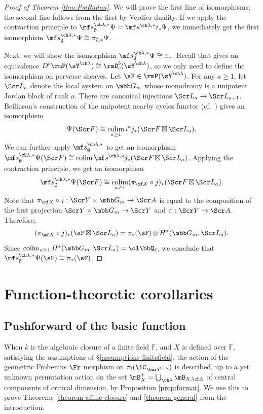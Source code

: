 \documentclass[final]{amsart}
\theoremstyle{remark}
\theoremstyle{definition}
\DeclareMathOperator*{\ot}{\otimes}
\DeclareMathOperator*{\bt}{\boxtimes}
\DeclareMathOperator*{\colim}{colim}
\numberwithin{equation}{section}
\begin{document}
\begin{proof}[Proof of Theorem \ref{thm:PsiRadon}]
We will prove the first line of isomorphisms; the second line follows from the first 
by Verdier duality. 
If we apply the contraction principle to 
$\mf s^{\ch\lambda,*}_\emptyset\Psi
= \mf s^{\ch\lambda,*} i_* \Psi$, 
we immediately get the first isomorphism 
$\mf s^{\ch\lambda,*}_\emptyset \Psi \cong \pi_{\emptyset,*}\Psi$. 


Next, we will show the isomorphism $\mf s^{\ch\lambda,*}_\emptyset \Psi \cong \pi_*$. 
Recall that \cite{Beilinson2} gives an equivalence 
$D^b \rmP(\sY^{\ch\lambda}) \cong \rmD^b_c(\sY^{\ch\lambda})$, 
so we only need to define the isomorphism on perverse sheaves. 
Let $\sF \in \rmP(\sY^{\ch\lambda})$. 
For any $a \ge 1$, let $\Scr L_a$ denote the local system on $\mbb G_m$
whose monodromy is a unipotent Jordan block of rank $a$. There are canonical
injections $\Scr L_a \to \Scr L_{a+1}$.
Beilinson's construction of the unipotent nearby cycles functor 
(cf.~\cite[2.3]{Beilinson}) gives an isomorphism 
\[ \Psi(\Scr F) \cong \colim_{a\ge 1} i^*j_*(\Scr F \bt \Scr L_a). \]
We can further apply $\mf s^{\ch\lambda,*}_\emptyset$ to get
an isomorphism $\mf s^{\ch\lambda,*}_\emptyset \Psi(\Scr F) \cong \colim \mf s^{\ch\lambda,*} j_*(\Scr F \bt \Scr L_a)$.
Applying the contraction principle, we get an isomorphism 
\[ \mf s^{\ch\lambda,*}_\emptyset \Psi(\Scr F) \cong \colim_{a\ge 1}
(\pi_{\mf X} \circ j)_*(\Scr F \bt \Scr L_a). \]
Note that $\pi_{\mf X}\circ j : \Scr Y \times \mbb G_m \to \Scr A$ 
is equal to the composition of the first projection $\Scr Y\times \mbb G_m\to \Scr Y$
and $\pi:\Scr Y \to \Scr A$. Therefore, 
\[ (\pi_{\mf X}\circ j)_* (\sF\bt \Scr L_a) 
= \pi_*(\sF) \ot H^*(\mbb G_m, \Scr L_a). \]
Since $\colim_{a\ge 1} H^*(\mbb G_m, \Scr L_a) = \ol\bbQ_\ell$, 
we conclude that $\mf s^{\ch\lambda,*}_\emptyset \Psi(\sF) \cong \pi_*(\sF)$.
\end{proof}


\section{Function-theoretic corollaries}

\subsection{Pushforward of the basic function} \label{sect:finitefields} 

When $k$ is the algebraic closure of a finite field $\mathbb F$, and $X$ is defined over $\mathbb F$, satisfying the assumptions of \S \ref{assumptions-finitefield}, the action of the geometric Frobenius $\Fr$ morphism on $ \bar\pi_!(\IC_{\barY^{\ch\lambda}})$ is described, up to a yet unknown permutation action on the set $\mB^+_X = \bigcup_{\ch\lambda} \mB_{X,\ch\lambda}$ of central components of critical dimension, by Proposition \ref{prop:format}. We use this to prove Theorems \ref{theorem-affine-closure} and \ref{theorem-general} from the introduction.
\end{document}
